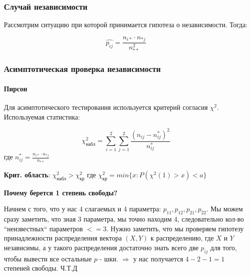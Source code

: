 \documentclass{article}
\begin{document}
    \subsubsection{Случай независимости}

    Рассмотрим ситуацию при которой принимается гипотеза о независимости. Тогда:

    \begin{equation}
        \widehat{p_{ij}} = \frac{n_{i*} \cdot n_{*j}}{n_{**}^2}
    \end{equation}


    \subsubsection{Асимптотическая проверка независимости}

    \paragraph{Пирсон}

    \quad

    Для асимптотического тестирования используется критерий согласия $\chi^2$. Используемая статистика:

    \begin{equation}
        \chi^2_{набл} = \sum_{i=1}^{2}{\sum_{j=1}^{2}{ \frac{( n_{ij} - n_{ij}^{*} )^{2}}{ n_{ij}^{*} } }}
    \end{equation}
    где $n_{ij}^{*} = \frac{n_{i*} \cdot n_{*j}}{n_{**}}$
    
    \textbf{Крит. область}: $\chi^2_{\text{набл}} > \chi^2_{\text{кр}}$ где $\chi^2_{\text{кр}} =
    min\{x: P(\chi^2(1) > x) < a  \}$

    \quad

    \textbf{Почему берется 1 степень свободы?}

    \quad

    Начнем с того, что у нас 4 слагаемых и 4 параметра: $p_{11}, p_{12}, p_{21}, p_{22}$.
    Мы можем сразу заметить, что зная 3 параметра, мы точно находим 4, следовательно кол-во ``неизвестных`` параметров $<= 3$.
    Нужно заметить, что мы проверяем гипотезу принадлежности распределения вектора $(X, Y)$ к распределению, где $X$ и $Y$ независимы,
    а у такого распределения достаточно знать всего две $p_{ij}$ для того, чтобы вывести все остальные $p$ - шки.
    $\Rightarrow$ у нас получается $4 - 2 - 1 = 1$ степеней свободы. Ч.Т.Д

    \quad
\end{document}
